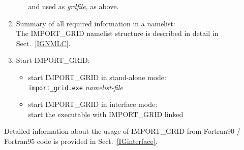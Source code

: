 \documentclass[11pt,twoside]{report}
\begin{document}
\begin{enumerate}
\begin{itemize}
and used as {\it grdfile}, as above.
\end{itemize}
\item Summary of all required information in a namelist:\\
The IMPORT\_GRID namelist structure is described in detail in 
Sect.~\ref{IGNMLC}.
\item Start IMPORT\_GRID:
\begin{itemize}
\item start IMPORT\_GRID in stand-alone mode:\\
\verb|import_grid.exe| {\it namelist-file}
\item start IMPORT\_GRID in interface mode:\\
start the executable with IMPORT\_GRID linked
\end{itemize}
\end{enumerate}
Detailed information about the usage of IMPORT\_GRID from Fortran90 /
Fortran95 code is provided in Sect.~\ref{IGinterface}.

\end{document}
